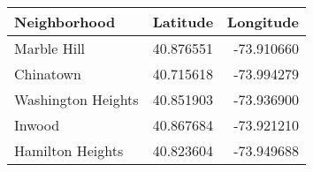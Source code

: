 \begin{tabular}{lrr}
\toprule
       Neighborhood &   Latitude &  Longitude \\
\midrule
        Marble Hill &  40.876551 & -73.910660 \\
          Chinatown &  40.715618 & -73.994279 \\
 Washington Heights &  40.851903 & -73.936900 \\
             Inwood &  40.867684 & -73.921210 \\
   Hamilton Heights &  40.823604 & -73.949688 \\
\bottomrule
\end{tabular}
